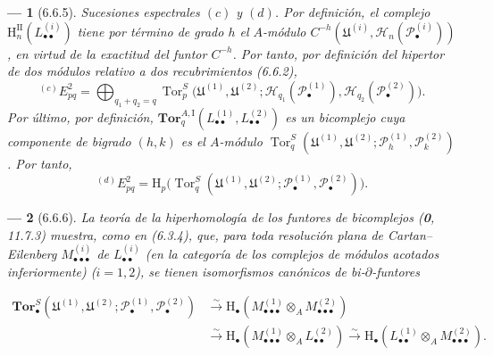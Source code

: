 \documentclass[10pt,oneside,openany]{book}
\theoremstyle{egaenv}\newtheorem*{env}{---}
\theoremstyle{egastatement}
\theoremstyle{egadescription}
\newcommand{\oldpage}[2][]{\marginnote{\normalfont\scriptsize\textbf{#1}\,|\,#2}\ignorespaces}
\begin{document}
\oldpage[III]{156}
\begin{env}[6.6.5]
\label{III.6.6.5}
\emph{Sucesiones espectrales $(c)$ y $(d)$.} Por definición, el complejo
$\mathrm H_n^{\mathrm{II}}(L_{\bullet\bullet}^{(i)})$ tiene por término de
grado $h$ el $A$-módulo
$C^{-h}(\mathfrak U^{(i)},\mathscr H_n(\mathscr P_\bullet^{(i)}))$, en virtud
de la exactitud del funtor $C^{-h}$. Por tanto, por definición del hipertor de
dos módulos relativo a dos recubrimientos (6.6.2),
\[
  {}^{(c)}E_{pq}^2
  =\bigoplus_{q_1+q_2=q}
   \operatorname{Tor}_p^S
   \bigl(\mathfrak U^{(1)},\mathfrak U^{(2)};
         \mathscr H_{q_1}(\mathscr P_\bullet^{(1)}),
         \mathscr H_{q_2}(\mathscr P_\bullet^{(2)})\bigr).
\]
Por último, por definición,
$\mathbf{Tor}_q^{A,\mathrm I}
(L_{\bullet\bullet}^{(1)},L_{\bullet\bullet}^{(2)})$ es un bicomplejo cuya
componente de bigrado $(h,k)$ es el $A$-módulo
$\operatorname{Tor}_q^S
(\mathfrak U^{(1)},\mathfrak U^{(2)};
 \mathscr P_h^{(1)},\mathscr P_k^{(2)})$. Por tanto,
\[
  {}^{(d)}E_{pq}^2
  =\mathrm H_p\bigl(
    \operatorname{Tor}_q^S
    (\mathfrak U^{(1)},\mathfrak U^{(2)};
     \mathscr P_\bullet^{(1)},\mathscr P_\bullet^{(2)})\bigr).
\]
\end{env}

\begin{env}[6.6.6]
\label{III.6.6.6}
La teoría de la hiperhomología de los funtores de bicomplejos
(\textbf{0}, 11.7.3) muestra, como en (6.3.4), que, para toda resolución
\emph{plana} de Cartan--Eilenberg $M_{\bullet\bullet\bullet}^{(i)}$ de
$L_{\bullet\bullet}^{(i)}$ (en la categoría de los complejos de módulos
acotados inferiormente) ($i=1,2$), se tienen isomorfismos canónicos de
bi-$\partial$-funtores

\label{III.6.6.6.1}
\[
\begin{aligned}
  \mathbf{Tor}_\bullet^S
  (\mathfrak U^{(1)},\mathfrak U^{(2)};
   \mathscr P_\bullet^{(1)},\mathscr P_\bullet^{(2)})
  &\xrightarrow{\sim}
   \mathrm H_\bullet
   (M_{\bullet\bullet\bullet}^{(1)}\otimes_A M_{\bullet\bullet\bullet}^{(2)})\\
  &\xrightarrow{\sim}
   \mathrm H_\bullet
   (M_{\bullet\bullet\bullet}^{(1)}\otimes_A L_{\bullet\bullet}^{(2)})
   \xrightarrow{\sim}
   \mathrm H_\bullet
   (L_{\bullet\bullet}^{(1)}\otimes_A M_{\bullet\bullet\bullet}^{(2)}).
\end{aligned}
\tag{6.6.6.1}\label{III.6.6.6.1.fr}
\]

\end{env}
\end{document}
